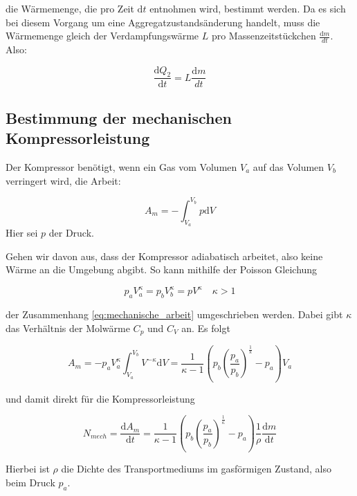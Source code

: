 die Wärmemenge, die pro Zeit $\mathup{d}t$ entnohmen wird, bestimmt werden.
Da es sich bei diesem Vorgang um eine Aggregatzustandsänderung handelt,
muss die Wärmemenge gleich der Verdampfungswärme $L$ pro Massenzeitstückchen $\frac{\mathup{d}m}{dt}$.
Also:

\begin{equation*}
\frac{\mathup{d} Q_2}{\mathup{d} t}=L\frac{\mathup{d}m}{dt}
\end{equation*}

\subsection{Bestimmung der mechanischen Kompressorleistung}

Der Kompressor benötigt, wenn ein Gas vom Volumen $V_a$ auf das Volumen $V_b$ verringert wird,
die Arbeit:

\begin{equation}
\label{eq:mechanische_arbeit}
A_m=-\int_{V_a}^{V_b}p\mathup{d}V
\end{equation}
Hier sei $p$ der Druck.

Gehen wir davon aus, dass der Kompressor adiabatisch arbeitet,
also keine Wärme an die Umgebung abgibt.
So kann mithilfe der Poisson Gleichung

\begin{equation*}
p_aV^{\kappa}_a=p_bV^{\kappa}_b=pV^{\kappa} \quad \kappa>1
\end{equation*}

der Zusammenhang \eqref{eq:mechanische_arbeit} umgeschrieben werden.
Dabei gibt $\kappa$ das Verhältnis der Molwärme $C_p$ und $C_V$ an.
Es folgt

\begin{equation*}
A_m=-p_aV_a^{\kappa}\int_{V_a}^{V_b}V^{-\kappa}\mathup{d}V=\frac{1}{\kappa-1}\left(p_b\left(\frac{p_a}{p_b}\right)^{\frac{1}{k}}-p_a\right)V_a
\end{equation*}

und damit direkt für die Kompressorleistung

\begin{equation}
N_{mech}=\frac{\mathup{d}A_m}{\mathup{d}t}=\frac{1}{\kappa-1}\left(p_b\left(\frac{p_a}{p_b}\right)^{\frac{1}{\kappa}}-p_a\right)\frac{1}{\rho}\frac{\mathup{d}m}{\mathup{d}t}
\label{eq: Nmech}
\end{equation}

Hierbei ist $\rho$ die Dichte des Transportmediums im gasförmigen Zustand, also beim Druck $p_a$.
